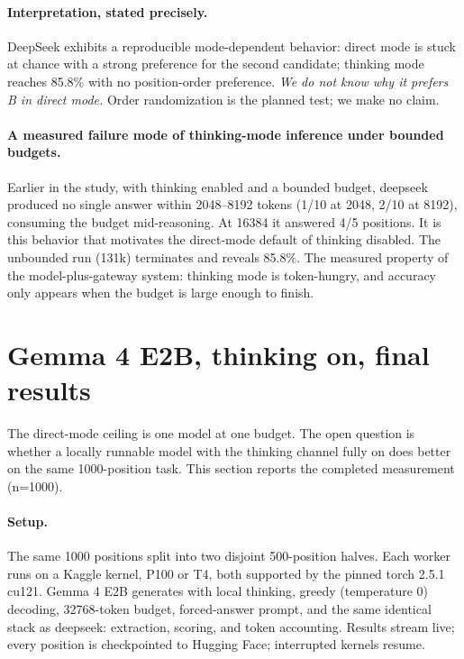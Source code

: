 \documentclass{article}
\begin{document}
\paragraph{Interpretation, stated precisely.} DeepSeek exhibits a
reproducible mode-dependent behavior: direct mode is stuck at chance
with a strong preference for the second candidate; thinking mode reaches
85.8\% with no position-order preference. \emph{We do not know why it
prefers B in direct mode.} Order randomization is the planned test; we
make no claim.

\paragraph{A measured failure mode of thinking-mode inference under
bounded budgets.} Earlier in the study, with thinking enabled and a
bounded budget, deepseek produced no single answer within 2048--8192
tokens (1/10 at 2048, 2/10 at 8192), consuming the budget mid-reasoning.
At 16384 it answered 4/5 positions. It is this behavior that motivates
the direct-mode default of thinking disabled. The unbounded run (131k)
terminates and reveals 85.8\%. The measured property of the
model-plus-gateway system: thinking mode is token-hungry, and accuracy
only appears when the budget is large enough to finish.

\section{Gemma 4 E2B, thinking on, final results}
\label{sec:gemma}
The direct-mode ceiling is one model at one budget. The open question is
whether a locally runnable model with the thinking channel fully on does
better on the same 1000-position task. This section reports the completed
measurement (n=1000).

\paragraph{Setup.} The same 1000 positions split into two disjoint
500-position halves. Each worker runs on a Kaggle kernel, P100 or T4,
both supported by the pinned torch 2.5.1 cu121. Gemma 4 E2B generates
with local thinking, greedy (temperature 0) decoding, 32768-token
budget, forced-answer prompt, and the same identical stack as deepseek:
extraction, scoring, and token accounting. Results stream live; every
position is checkpointed to Hugging Face; interrupted kernels resume.
\end{document}
